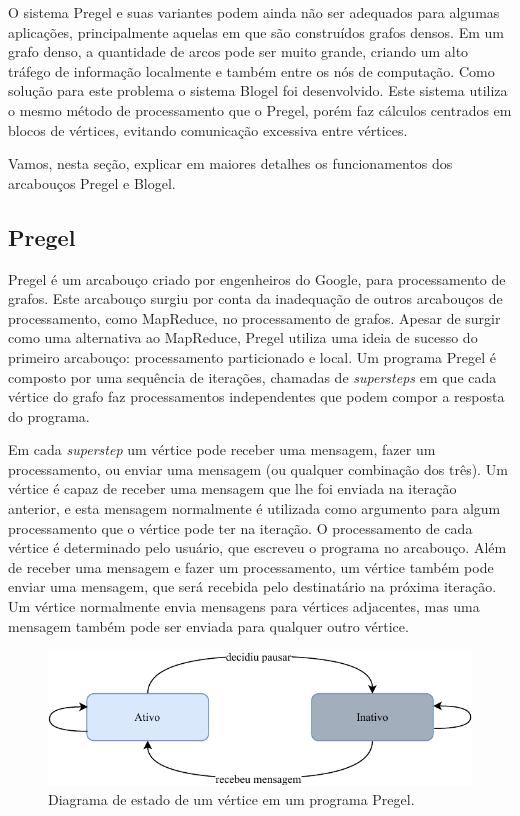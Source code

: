 \documentclass[conference]{IEEEtran}
\begin{document}
O sistema Pregel e suas variantes podem ainda não ser adequados para
algumas aplicações, principalmente aquelas em que são construídos grafos
densos. Em um grafo denso, a quantidade de arcos pode ser muito grande,
criando um alto tráfego de informação localmente e também entre os nós
de computação. Como solução para este problema o sistema Blogel foi
desenvolvido. Este sistema utiliza o mesmo método de processamento que o
Pregel, porém faz cálculos centrados em blocos de vértices, evitando
comunicação excessiva entre vértices.

Vamos, nesta seção, explicar em maiores detalhes os funcionamentos dos
arcabouços Pregel e Blogel.

\subsection{Pregel}
Pregel é um arcabouço criado por engenheiros do Google, para
processamento de grafos. Este arcabouço surgiu por conta da inadequação
de outros arcabouços de processamento, como MapReduce, no processamento
de grafos. Apesar de surgir como uma alternativa ao MapReduce, Pregel
utiliza uma ideia de sucesso do primeiro arcabouço: processamento
particionado e local. Um programa Pregel é composto por uma sequência
de iterações, chamadas de {\em supersteps} em que cada vértice do grafo
faz processamentos independentes que podem compor a resposta do
programa.

Em cada {\em superstep} um vértice pode receber uma mensagem, fazer um
processamento, ou enviar uma mensagem (ou qualquer combinação dos três).
Um vértice é capaz de receber uma mensagem que lhe foi enviada na
iteração anterior, e esta mensagem normalmente é utilizada como
argumento para algum processamento que o vértice pode ter na iteração. O
processamento de cada vértice é determinado pelo usuário, que escreveu o
programa no arcabouço. Além de receber uma mensagem e fazer um
processamento, um vértice também pode enviar uma mensagem, que será
recebida pelo destinatário na próxima iteração. Um vértice normalmente
envia mensagens para vértices adjacentes, mas uma mensagem também pode
ser enviada para qualquer outro vértice.

\begin{figure}
    \begin{center}
        \includegraphics[width=.45\textwidth]{pregel/vertex_state.pdf}
    \end{center}
    \caption{Diagrama de estado de um vértice em um programa Pregel.}
    \label{fig:pregel_states}
\end{figure}
\end{document}
